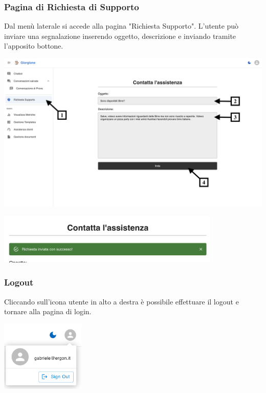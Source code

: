 \subsubsection{Pagina di Richiesta di Supporto}
Dal menù laterale si accede alla pagina "Richiesta Supporto". L’utente può inviare una segnalazione inserendo oggetto, descrizione e inviando tramite l’apposito bottone.
\begin{center}
    \includegraphics[width=\textwidth]{./img/RichiestaAssistenza1.png}
    \label{fig:Pagina di Assistenza}
\end{center}

\begin{center}
    \includegraphics[width=0.8\textwidth]{./img/RichiestaAssistenza2.png}
    \label{fig:InvioRiuscito}
\end{center}

\subsubsection{Logout}
Cliccando sull’icona utente in alto a destra è possibile effettuare il logout e tornare alla pagina di login.
\begin{center}
    \includegraphics[width=0.3\textwidth]{./img/logout.png}
\end{center}

